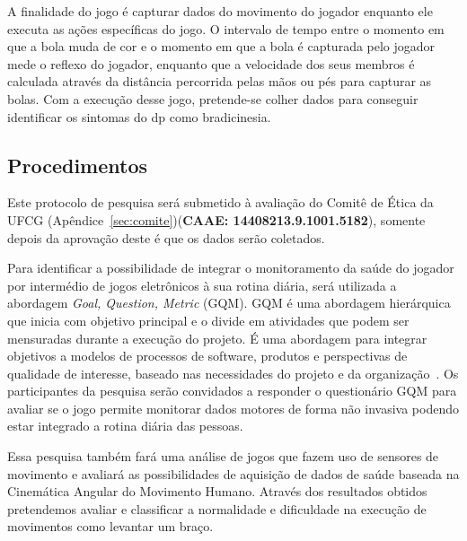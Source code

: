 A finalidade do jogo é capturar dados do movimento do jogador enquanto ele executa as ações específicas do jogo. O intervalo de tempo entre o momento em que a bola muda de cor e o momento em que a bola é capturada pelo jogador mede o reflexo do jogador, enquanto que a velocidade dos seus membros é calculada através da distância percorrida pelas mãos ou pés para capturar as bolas.
Com a execução desse jogo, pretende-se colher dados para conseguir identificar os sintomas do \ac{dp} como bradicinesia.



\subsection{Procedimentos}

Este protocolo de pesquisa será submetido à avaliação do Comitê de Ética da UFCG (Apêndice~\ref{sec:comite})(\textbf{CAAE: 14408213.9.1001.5182}), somente depois da aprovação deste é que os dados serão coletados.

Para identificar a possibilidade de integrar o monitoramento da saúde do jogador por intermédio de jogos eletrônicos à sua rotina diária, será utilizada a abordagem \textit{Goal, Question, Metric} (GQM). GQM é uma abordagem hierárquica que inicia com objetivo principal e o divide em atividades que podem ser mensuradas durante a execução do projeto. É uma abordagem para integrar objetivos a modelos de processos de software, produtos e perspectivas de qualidade de interesse, baseado nas necessidades do projeto e da organização~\cite{van1999goal}. Os participantes da pesquisa serão convidados a responder o questionário GQM para avaliar se o jogo permite monitorar dados motores de forma não invasiva podendo estar integrado a rotina diária das pessoas.

Essa pesquisa também fará uma análise de jogos que fazem uso de sensores de movimento e avaliará as possibilidades de aquisição de dados de saúde baseada na Cinemática Angular do Movimento Humano. Através dos resultados obtidos pretendemos avaliar e classificar a normalidade e dificuldade na %
execução de movimentos como levantar um braço.

